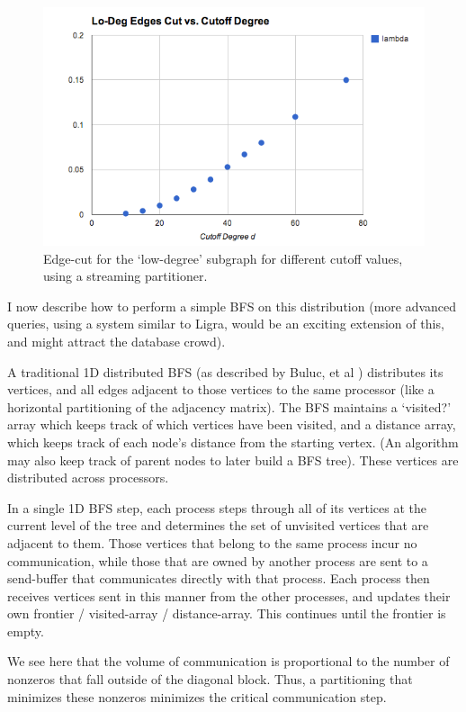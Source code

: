 \documentclass[11pt]{article}
\begin{document}
\begin{figure}[h!]
\centering
\includegraphics[scale=0.50] {figures/litreview/edgecut}
\caption[Caption for]{Edge-cut for the `low-degree' subgraph for different cutoff values, using a streaming partitioner.}
\label{fig:02}
\end{figure}

I now describe how to perform a simple BFS on this distribution (more advanced queries, using a system similar to Ligra, would be an exciting extension of this, and might attract the database crowd).

A traditional 1D distributed BFS (as described by Buluc, et al \cite{}) distributes its vertices, and all edges adjacent to those vertices to the same processor (like a horizontal partitioning of the adjacency matrix). The BFS maintains a `visited?' array which keeps track of which vertices have been visited, and a distance array, which keeps track of each node's distance from the starting vertex. (An algorithm may also keep track of parent nodes to later build a BFS tree). These vertices are distributed across processors. 

In a single 1D BFS step, each process steps through all of its vertices at the current level of the tree and determines the set of unvisited vertices that are adjacent to them. Those vertices that belong to the same process incur no communication, while those that are owned by another process are sent to a send-buffer that communicates directly with that process. Each process then receives vertices sent in this manner from the other processes, and updates their own frontier / visited-array / distance-array. This continues until the frontier is empty.

We see here that the volume of communication is proportional to the number of nonzeros that fall outside of the diagonal block. Thus, a partitioning that minimizes these nonzeros minimizes the critical communication step. 
\end{document}
